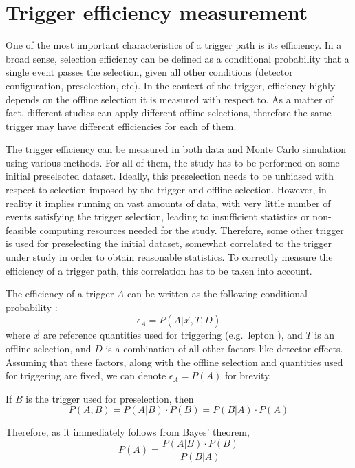 \section{Trigger efficiency measurement}
\label{s:trigger_efficicency_measurement}
One of the most important characteristics of a trigger path is its efficiency. In a broad sense, selection efficiency
can be defined as a conditional probability that a single event passes the selection, given all other conditions
(detector configuration, preselection, etc). In the context of the trigger, efficiency highly depends on the offline
selection it is measured with respect to. As a matter of fact, different studies can apply different offline selections,
therefore the same trigger may have different efficiencies for each of them.

The trigger efficiency can be measured in both data and Monte Carlo simulation using various methods. For all of them,
the study has to be performed on some initial preselected dataset. Ideally, this preselection needs to be unbiased with
respect to selection imposed by the trigger and offline selection. However, in reality it implies running on vast
amounts of data, with very little number of events satisfying the trigger selection, leading to insufficient statistics
or non-feasible computing resources needed for the study. Therefore, some other trigger is used for preselecting the
initial dataset, somewhat correlated to the trigger under study in order to obtain reasonable statistics. To correctly
measure the efficiency of a trigger path, this correlation has to be taken into account.

The efficiency of a trigger $A$ can be written as the following conditional probability \cite{selection_efficiency}:
\begin{equation}
\epsilon_{A} = P(A | \vec{x}, T, D)
\end{equation}
where $\vec{x}$ are reference quantities used for triggering (e.g.\ lepton \pt), and $T$ is an offline selection, and
$D$ is a combination of all other factors like detector effects. Assuming that these factors, along with the offline
selection and quantities used for triggering are fixed, we can denote $\epsilon_{A} = P(A)$ for brevity.

If $B$ is the trigger used for preselection, then
\begin{equation}
P(A, B) = P(A | B) \cdot P(B) = P(B | A) \cdot P(A)
\end{equation}

Therefore, as it immediately follows from Bayes' theorem,
\begin{equation}
P(A) = \frac{P(A | B) \cdot P(B)}{P(B | A)}
\end{equation}

